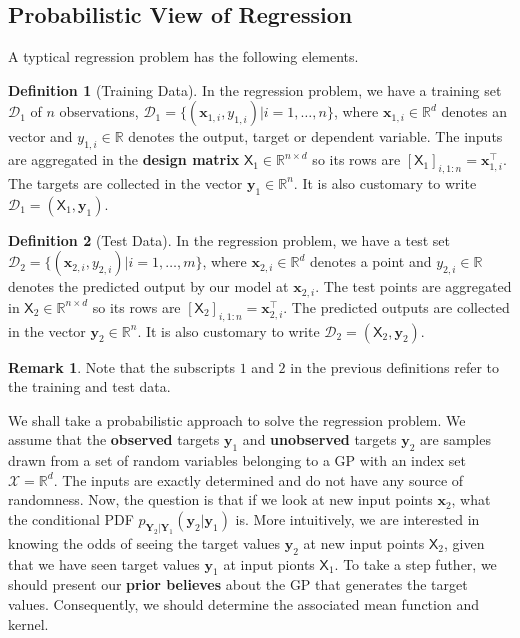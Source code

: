 \documentclass[10pt]{article}
\theoremstyle{definition}
\newtheorem{defn}{Definition}[section]
\newtheorem*{rem}{Remark}
\begin{document}
\subsection{Probabilistic View of Regression}
A typtical regression problem has the following elements.
\begin{defn}[Training Data]
In the regression problem, we have a training set $\mathcal{D}_1$ of $n$ observations, $\mathcal{D}_1=\{(\mathbf{x}_{1,i}, y_{1,i})|i=1,\dots,n\}$, where $\mathbf{x}_{1,i}\in\mathbb{R}^{d}$ denotes an  vector and $y_{1,i}\in\mathbb{R}$ denotes the output, target or dependent variable. The inputs are aggregated in the \textbf{design matrix} $\mathsf{X}_1\in \mathbb{R}^{n\times d}$ so its rows are $[\mathsf{X}_1]_{i,1:n}=\mathbf{x}_{1,i}^{\top}$. The targets are collected in the vector $\mathbf{y}_1\in\mathbb{R}^n$. It is also customary to write $\mathcal{D}_1=(\mathsf{X}_1, \mathbf{y}_1)$.
\end{defn}
\begin{defn}[Test Data]
In the regression problem, we have a test set $\mathcal{D}_2=\{(\mathbf{x}_{2,i}, y_{2,i})|i=1,\dots,m\}$, where $\mathbf{x}_{2,i}\in\mathbb{R}^{d}$ denotes a  point and $y_{2,i}\in\mathbb{R}$ denotes the predicted output by our model at $\mathbf{x}_{2,i}$. The test points are aggregated in $\mathsf{X}_2\in \mathbb{R}^{n\times d}$ so its rows are $[\mathsf{X}_2]_{i,1:n}=\mathbf{x}_{2,i}^{\top}$. The predicted outputs are collected in the vector $\mathbf{y}_2\in\mathbb{R}^n$. It is also customary to write $\mathcal{D}_2=(\mathsf{X}_2, \mathbf{y}_2)$.
\end{defn}
\begin{rem}
Note that the subscripts $1$ and $2$ in the previous definitions refer to the training and test data.
\end{rem}
We shall take a probabilistic approach to solve the regression problem. We assume that the \textbf{observed} targets $\mathbf{y}_1$ and \textbf{unobserved} targets $\mathbf{y}_2$ are samples drawn from a set of random variables belonging to a GP with an index set $\mathcal{X}=\mathbb{R}^d$. The inputs are exactly determined and do not have any source of randomness. Now, the question is that if we look at new input points $\mathbf{x}_2$, what the conditional PDF $p_{\mathbf{Y}_2|\mathbf{Y}_1}(\mathbf{y}_2|\mathbf{y}_1)$ is. More intuitively, we are interested in knowing the odds of seeing the target values $\mathbf{y}_2$ at new input points $\mathsf{X}_2$, given that we have seen target values $\mathbf{y}_1$ at input pionts $\mathsf{X}_1$.  To take a step futher, we should present our \textbf{prior believes} about the GP that generates the target values. Consequently, we should determine the associated mean function and kernel. 
\end{document}
